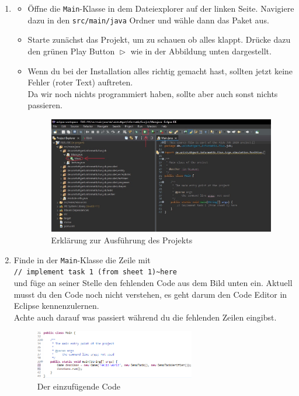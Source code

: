 \begin{enumerate}
    \item
    \begin{itemize}
        \item Öffne die \texttt{Main}-Klasse in dem Dateiexplorer auf der linken Seite. Navigiere dazu in den \texttt{src/main/java} Ordner und wähle dann das Paket \texttt{\javaPackageName} aus.
        \item Starte zunächst das Projekt, um zu schauen ob alles klappt. Drücke dazu den grünen Play Button $\vartriangleright$ wie in der Abbildung unten dargestellt.
        \item Wenn du bei der Installation alles richtig gemacht hast, sollten jetzt keine Fehler (roter Text) auftreten.\\
        Da wir noch nichts programmiert haben, sollte aber auch sonst nichts passieren.
		\begin{figure} [H]
			\centering
			\includegraphics [width=1\textwidth]{./figures/ide.jpg}
			\caption{Erklärung zur Ausführung des Projekts}
		\end{figure}
    \end{itemize}
    \item
	\label{ex1b}
	Finde in der \lstinline{Main}-Klasse die Zeile mit\\
	\hspace*{\fill}\lstinline{// implement task 1 (from sheet 1)~here}\hspace*{\fill}\\ und füge an seiner Stelle den fehlenden Code aus dem Bild unten ein.
    Aktuell musst du den Code noch nicht verstehen, es geht darum den Code Editor in Eclipse kennenzulernen.\\
    Achte auch darauf was passiert während du die fehlenden Zeilen eingibst.

	\begin{figure} [H]
		\centering
		\label{code}
		\includegraphics [width=0.66\textwidth]{./figures/code.1.png}
		\caption{Der einzufügende Code}
	\end{figure}


\end{enumerate}
